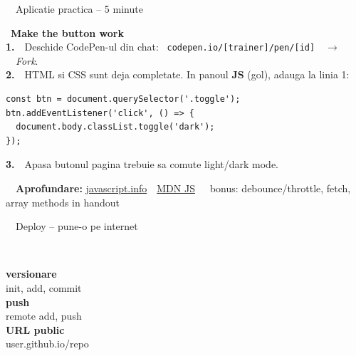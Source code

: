 \documentclass[aspectratio=169,11pt]{beamer}
\newcommand{\setaccent}[1]{\colorlet{accent}{#1}}
\begin{document}
\begin{frame}[fragile]{\textcolor{themeJs}{\faGamepad}\ \ Aplicatie practica -- 5 minute}
  \vspace{8pt}
  \begin{joculet}
    {\large\color{themeJs}\faGamepad\ \textbf{Make the button work}}\\[8pt]

    {\bfseries\color{themeJs}1.}\ \ Deschide CodePen-ul din chat: {\color{themeJs}\faLink\ \texttt{codepen.io/[trainer]/pen/[id]}}\ \ $\to$\ \ \emph{Fork}.\\[5pt]
    {\bfseries\color{themeJs}2.}\ \ HTML si CSS sunt deja completate. In panoul \textbf{JS} (gol), adauga la linia 1:\\[3pt]
    \begin{lstlisting}[style=js, numbers=none, basicstyle=\ttfamily\footnotesize]
const btn = document.querySelector('.toggle');
btn.addEventListener('click', () => {
  document.body.classList.toggle('dark');
});
    \end{lstlisting}
    \vspace{1pt}
    {\bfseries\color{themeJs}3.}\ \ Apasa butonul \textendash{} pagina trebuie sa comute light/dark mode.
  \end{joculet}

  \vspace{4pt}
  {\footnotesize\color{textDim}\faGraduationCap\ \ \textbf{Aprofundare:} \href{https://javascript.info}{javascript.info} \,\textbullet\, \href{https://developer.mozilla.org/en-US/docs/Web/JavaScript}{MDN JS} \,\textbullet\, \textcolor{themeBonus}{\faRocket\ bonus: debounce/throttle, fetch, array methods in handout}}
\end{frame}

\setaccent{themeDeploy}

\begin{frame}[c]{\textcolor{themeDeploy}{\faRocket}\ \ Deploy -- pune-o pe internet}
  \begin{columns}[T,onlytextwidth]
    \centering
    {\color{themeDeploy}\fontsize{60}{60}\selectfont\faCodeBranch}\\[16pt]
    {\Large\bfseries versionare}\\[4pt]
    {\small\color{textDim}init, add, commit}
    \centering
    {\color{themeDeploy}\fontsize{60}{60}\selectfont\faUpload}\\[16pt]
    {\Large\bfseries push}\\[4pt]
    {\small\color{textDim}remote add, push}
    \centering
    {\color{themeDeploy}\fontsize{60}{60}\selectfont\faGlobe}\\[16pt]
    {\Large\bfseries URL public}\\[4pt]
    {\small\color{textDim}user.github.io/repo}
  \end{columns}
\end{frame}
\end{document}
